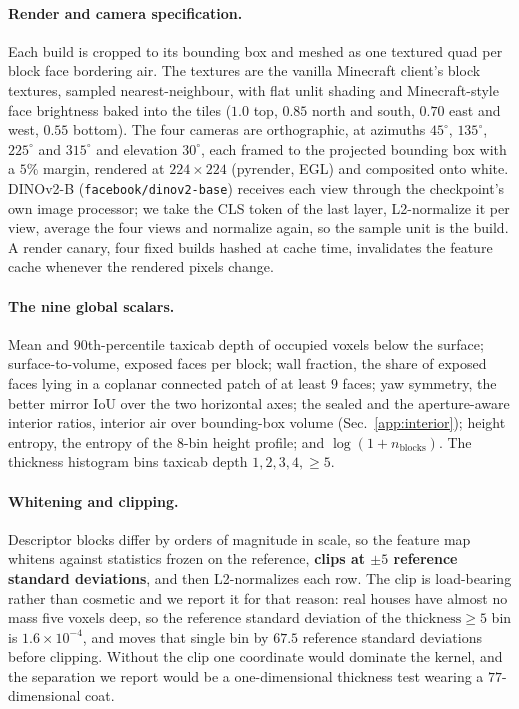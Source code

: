 \paragraph{Render and camera specification.} Each build is cropped to its
bounding box and meshed as one textured quad per block face bordering air. The
textures are the vanilla Minecraft client's block textures, sampled
nearest-neighbour, with flat unlit shading and Minecraft-style face brightness
baked into the tiles ($1.0$ top, $0.85$ north and south, $0.70$ east and west,
$0.55$ bottom). The four cameras are orthographic, at azimuths $45^\circ$,
$135^\circ$, $225^\circ$ and $315^\circ$ and elevation $30^\circ$, each framed
to the projected bounding box with a $5\%$ margin, rendered at
$224{\times}224$ (pyrender, EGL) and composited onto white. DINOv2-B
(\texttt{facebook/dinov2-base}) receives each view through the checkpoint's own
image processor; we take the CLS token of the last layer, L2-normalize it per
view, average the four views and normalize again, so the sample unit is the
build. A render canary, four fixed builds hashed at cache time, invalidates the
feature cache whenever the rendered pixels change.

\paragraph{The nine global scalars.} Mean and $90$th-percentile taxicab depth
of occupied voxels below the surface; surface-to-volume, exposed faces per
block; wall fraction, the share of exposed faces lying in a coplanar connected
patch of at least $9$ faces; yaw symmetry, the better mirror IoU over the two
horizontal axes; the sealed and the aperture-aware interior ratios, interior air
over bounding-box volume (Sec.~\ref{app:interior}); height entropy, the entropy
of the $8$-bin height profile; and $\log(1+n_{\text{blocks}})$. The thickness
histogram bins taxicab depth $1, 2, 3, 4, \geq 5$.

\paragraph{Whitening and clipping.} Descriptor blocks differ by orders of
magnitude in scale, so the feature map whitens against statistics frozen on the
reference, \textbf{clips at $\pm 5$ reference standard deviations}, and then
L2-normalizes each row. The clip is load-bearing rather than cosmetic and we
report it for that reason: real houses have almost no mass five voxels deep, so
the reference standard deviation of the $\text{thickness} \geq 5$ bin is
$1.6\times10^{-4}$, and \solidify{} moves that single bin by $67.5$ reference
standard deviations before clipping. Without the clip one coordinate would
dominate the kernel, and the separation we report would be a one-dimensional
thickness test wearing a $77$-dimensional coat.

